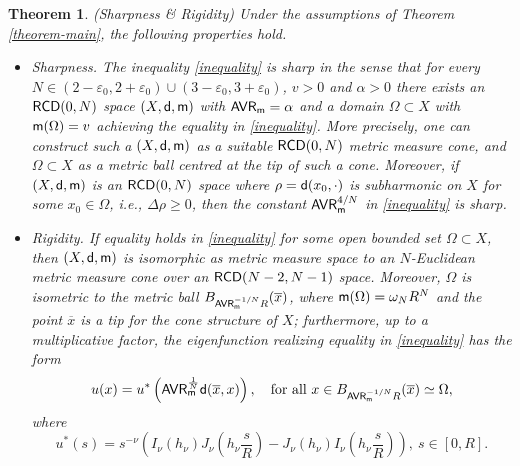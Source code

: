 \documentclass[11pt, reqno]{amsart}
\newtheorem{theorem}{Theorem}[section]
\numberwithin{equation}{section}
\begin{document}
		
		\begin{theorem}\label{theorem-main-sharpness-rigidity} {\rm (Sharpness \& Rigidity)}
		Under  the assumptions of Theorem \ref{theorem-main}, the following properties hold. 
		\begin{itemize} 
			\item[(i)] \emph{Sharpness.}   The inequality \eqref{inequality} is sharp  in the sense that for every $N\in (2-\varepsilon_0,2+\varepsilon_0)\cup (3-\varepsilon_0,3+\varepsilon_0)$, $v>0$ and  $\alpha>0$ there exists an ${\sf RCD}(0,N)$ space $(X, {\sf d}, {\sf m})$ with ${\sf AVR}_ {\sf m}=\alpha$ and a domain $\Omega\subset X$ with ${\sf m}(\Omega)=v$ achieving the equality in  \eqref{inequality}.  More precisely,  one can construct such a $(X, {\sf d}, {\sf m})$ as a suitable ${\sf RCD}(0,N)$ metric measure cone, and $\Omega\subset X$ as a metric ball centred at the tip of such a cone. Moreover, if $(X, {\sf d}, {\sf m})$ is an ${\sf RCD}(0,N)$ space where $\rho={\sf d}(x_0,\cdot)$ is subharmonic on $X$ for some $x_0\in \Omega$, i.e., $\Delta \rho \geq 0$, then the constant $ {\sf AVR}_ {\sf m}^{4/N}$ in \eqref{inequality} is sharp.   
			\item[(ii)]   \emph{Rigidity.} 
  If  equality holds in \eqref{inequality} for some open bounded set $\Omega\subset X$, then $(X, {\sf d}, {\sf m})$ is isomorphic as metric measure space to an $N$-Euclidean metric measure cone over an ${\sf RCD}(N-2,N-1)$ space. Moreover, $\Omega$ is isometric to the metric ball $B_{{\sf AVR}_ {\sf m}^{-{1}/{N}}R}(\overline x)$, where ${\sf m}(\Omega)=\omega_N R^N$ and  the point  $\overline x$ is  a tip for the cone structure of $X$; furthermore, up to a multiplicative factor, the eigenfunction realizing equality in \eqref{inequality} has the form 		
 \begin{equation*}
 u(x)=u^*\left({\sf AVR}_ {\sf m}^{\frac{1}{N}}{\sf d}(\overline x,x)\right),\quad \text{for all }  x\in B_{{\sf AVR}_ {\sf m}^{-{1}/{N}}R}(\overline x)\simeq \Omega,
 \end{equation*}
			where 
	\begin{equation}\label{eq:defu*Intro}
 u^*(s)=s^{-\nu}\left(I_\nu(h_\nu) J_\nu\left(h_\nu\frac{s}{R} \right)-J_\nu(h_\nu)  I_\nu\left(h_\nu\frac{s}{R} \right)\right), \ s\in [0,R].
    \end{equation}
		\end{itemize}
		\end{theorem}
		
  
	
\end{document}
